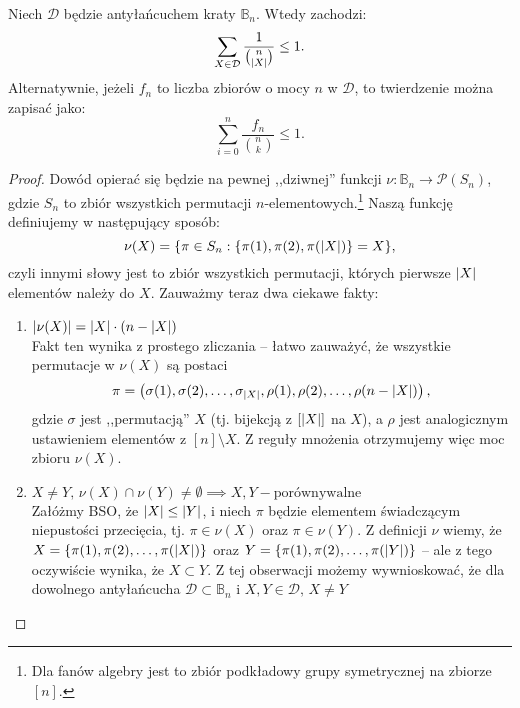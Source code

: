 \begin{theorem}
	Niech $\mathcal{D}$ będzie antyłańcuchem kraty $\mathbb B_n$.
	Wtedy zachodzi:
	\begin{equation}
		\sum_{X \in \mathcal{D}} \frac{1}{\binom{n}{\card{X}}} \leq 1.
	\end{equation}
	Alternatywnie, jeżeli $f_n$ to liczba zbiorów o mocy $n$ w $\mathcal{D}$,
	to twierdzenie można zapisać jako:
	\begin{equation}
		\sum_{i=0}^{n} \frac{f_n}{\binom{n}{k}} \leq 1.
	\end{equation}
\end{theorem}

\begin{proof}
	Dowód opierać się będzie na pewnej ,,dziwnej'' funkcji $\nu: \mathbb B_n \to \mathcal{P}(S_n)$,
	gdzie $S_n$ to zbiór wszystkich permutacji $n$-elementowych.\footnote{Dla fanów algebry jest to zbiór podkładowy grupy symetrycznej na zbiorze $[n]$.}
	Naszą funkcję definiujemy w następujący sposób:
	$$\nu(X) = \set{\pi \in S_n: \set{\pi(1), \pi(2), \pi(\card{X})} = X},$$
	czyli innymi słowy jest to zbiór wszystkich permutacji, których pierwsze $\card{X}$
	elementów należy do $X$. Zauważmy teraz dwa ciekawe fakty:
	\begin{enumerate}
		\item $\card{\nu(X)} = \card{X} \cdot (n - \card{X})$ \\
		      Fakt ten wynika z prostego zliczania -- łatwo zauważyć, że wszystkie permutacje
		      w $\nu(X)$ są postaci $$\pi = \left(\sigma(1), \sigma(2), \ldots, \sigma_{\card{X}},
			      \rho(1), \rho(2), \ldots, \rho(n - \card{X})\right),$$
		      gdzie $\sigma$ jest ,,permutacją'' $X$ (tj. bijekcją z $[\card{X}]$ na $X$),
		      a $\rho$ jest analogicznym ustawieniem elementów z $[n] \setminus X$. Z reguły mnożenia
		      otrzymujemy więc moc zbioru $\nu(X)$.
		\item $X \neq Y,\, \nu(X) \cap \nu(Y) \neq \emptyset \implies X, Y - \text{porównywalne}$ \\
		      Załóżmy BSO, że $\card{X} \leq \card{Y}$, i niech $\pi$ będzie elementem świadczącym
		      niepustości przecięcia, tj. $\pi \in \nu(X)$ oraz $\pi \in \nu(Y)$. Z definicji $\nu$
		      wiemy, że $X = \set{\pi(1), \pi(2), \ldots, \pi(\card{X})}$ oraz
		      $Y = \set{\pi(1), \pi(2), \ldots, \pi(\card{Y})}$ -- ale z tego oczywiście
		      wynika, że $X \subset Y$. Z tej obserwacji możemy wywnioskować, że dla dowolnego
		      antyłańcucha $\mathcal{D} \subset \mathbb B_n$ i $X, Y \in \mathcal{D},\, X \neq Y$

\end{enumerate}
\end{proof}
